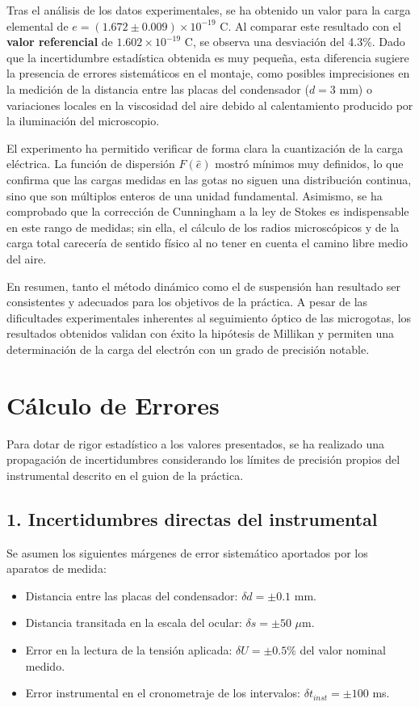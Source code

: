 \documentclass[9pt,a4paper,twocolumn,twoside]{rho-class/rho}
\begin{document}
Tras el análisis de los datos experimentales, se ha obtenido un valor para la carga elemental de $e = (1.672 \pm 0.009) \times 10^{-19}$ C. Al comparar este resultado con el \textbf{valor referencial} de $1.602 \times 10^{-19}$ C, se observa una desviación del 4.3\%. Dado que la incertidumbre estadística obtenida es muy pequeña, esta diferencia sugiere la presencia de errores sistemáticos en el montaje, como posibles imprecisiones en la medición de la distancia entre las placas del condensador ($d = 3$ mm) o variaciones locales en la viscosidad del aire debido al calentamiento producido por la iluminación del microscopio.

El experimento ha permitido verificar de forma clara la cuantización de la carga eléctrica. La función de dispersión $F(\hat{e})$ mostró mínimos muy definidos, lo que confirma que las cargas medidas en las gotas no siguen una distribución continua, sino que son múltiplos enteros de una unidad fundamental. Asimismo, se ha comprobado que la corrección de Cunningham a la ley de Stokes es indispensable en este rango de medidas; sin ella, el cálculo de los radios microscópicos y de la carga total carecería de sentido físico al no tener en cuenta el camino libre medio del aire.

En resumen, tanto el método dinámico como el de suspensión han resultado ser consistentes y adecuados para los objetivos de la práctica. A pesar de las dificultades experimentales inherentes al seguimiento óptico de las microgotas, los resultados obtenidos validan con éxito la hipótesis de Millikan y permiten una determinación de la carga del electrón con un grado de precisión notable.
\appendix
\section{Cálculo de Errores}

Para dotar de rigor estadístico a los valores presentados, se ha realizado una propagación de incertidumbres considerando los límites de precisión propios del instrumental descrito en el guion de la práctica.

\subsection*{1. Incertidumbres directas del instrumental}

Se asumen los siguientes márgenes de error sistemático aportados por los aparatos de medida:
\begin{itemize}
    \item Distancia entre las placas del condensador: $\delta d = \pm 0.1$ mm.
    \item Distancia transitada en la escala del ocular: $\delta s = \pm 50$ $\mu$m.
    \item Error en la lectura de la tensión aplicada: $\delta U = \pm 0.5\%$ del valor nominal medido.
    \item Error instrumental en el cronometraje de los intervalos: $\delta t_{inst} = \pm 100$ ms.
\end{itemize}
\end{document}
